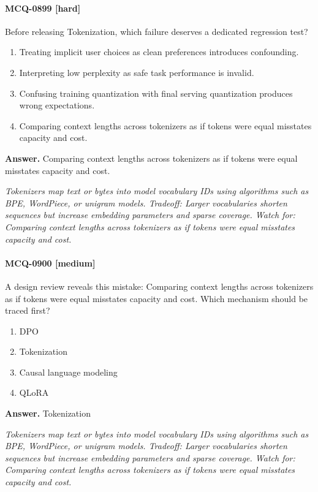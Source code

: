 \paragraph{MCQ-0899 [hard]} Before releasing Tokenization, which failure deserves a dedicated regression test?
\begin{enumerate}[label=\Alph*.]
\item Treating implicit user choices as clean preferences introduces confounding.
\item Interpreting low perplexity as safe task performance is invalid.
\item Confusing training quantization with final serving quantization produces wrong expectations.
\item Comparing context lengths across tokenizers as if tokens were equal misstates capacity and cost.
\end{enumerate}
\noindent\textbf{Answer.} Comparing context lengths across tokenizers as if tokens were equal misstates capacity and cost.
\par\textit{Tokenizers map text or bytes into model vocabulary IDs using algorithms such as BPE, WordPiece, or unigram models. Tradeoff: Larger vocabularies shorten sequences but increase embedding parameters and sparse coverage. Watch for: Comparing context lengths across tokenizers as if tokens were equal misstates capacity and cost.}
\paragraph{MCQ-0900 [medium]} A design review reveals this mistake: Comparing context lengths across tokenizers as if tokens were equal misstates capacity and cost. Which mechanism should be traced first?
\begin{enumerate}[label=\Alph*.]
\item DPO
\item Tokenization
\item Causal language modeling
\item QLoRA
\end{enumerate}
\noindent\textbf{Answer.} Tokenization
\par\textit{Tokenizers map text or bytes into model vocabulary IDs using algorithms such as BPE, WordPiece, or unigram models. Tradeoff: Larger vocabularies shorten sequences but increase embedding parameters and sparse coverage. Watch for: Comparing context lengths across tokenizers as if tokens were equal misstates capacity and cost.}
